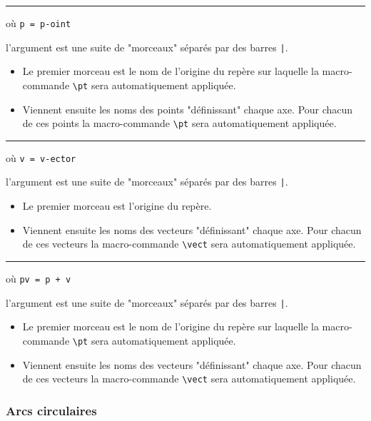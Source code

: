 \documentclass[12pt,a4paper]{article}
\newcommand\env[1]{\texttt{#1}}
\newcommand\macro[1]{\env{\textbackslash{}#1}}
\theoremstyle{definition}
\newcommand\separation{
	\medskip
	\hfill\rule{0.5\textwidth}{0.75pt}\hfill
	\medskip
}
\newcommand\mwhyprefix[2]{%
	\texttt{#1 = #1-#2}%
}
\newcommand\prefix[1]{%
	\texttt{#1}%
}
\begin{document}
\separation

 où \quad \mwhyprefix{p}{oint}

\IDarg{} l'argument est une suite de "morceaux" séparés par des barres \verb+|+.

\begin{itemize}[topsep=0pt]
	\item Le premier morceau est le nom de l'origine du repère sur laquelle la macro-commande \macro{pt} sera automatiquement appliquée.

	\item Viennent ensuite les noms des points "définissant" chaque axe. Pour chacun de ces points la macro-commande \macro{pt} sera automatiquement appliquée.
\end{itemize}


\separation

 où \quad \mwhyprefix{v}{ector}

\IDarg{} l'argument est une suite de "morceaux" séparés par des barres \verb+|+.

\begin{itemize}[topsep=0pt]
	\item Le premier morceau est l'origine du repère.

	\item Viennent ensuite les noms des vecteurs "définissant" chaque axe. Pour chacun de ces vecteurs la macro-commande \macro{vect} sera automatiquement appliquée.
\end{itemize}


\separation

 où \quad \prefix{pv = p + v}

\IDarg{} l'argument est une suite de "morceaux" séparés par des barres \verb+|+.

\begin{itemize}[topsep=0pt]
	\item Le premier morceau est le nom de l'origine du repère sur laquelle la macro-commande \macro{pt} sera automatiquement appliquée.

	\item Viennent ensuite les noms des vecteurs "définissant" chaque axe. Pour chacun de ces vecteurs la macro-commande \macro{vect} sera automatiquement appliquée.
\end{itemize}
\subsubsection{Arcs circulaires}
\end{document}
